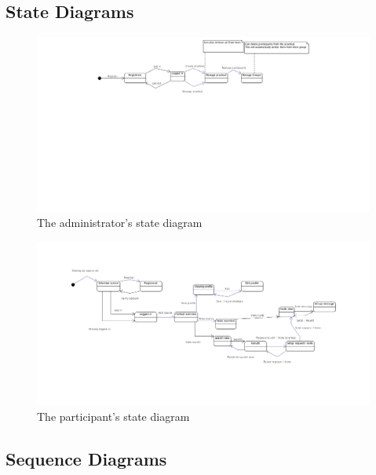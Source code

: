 \subsection{State Diagrams}

\begin{figure}[h]
    \centering
    \captionsetup{justification=centering}
    \includegraphics[width=\textwidth, frame]{images/state_diagram_admin}
    \caption{The administrator's state diagram}
    \label{state_diagram_admin}
\end{figure}

\begin{figure}[h]
    \centering
    \captionsetup{justification=centering}
    \includegraphics[width=\textwidth, frame]{images/state_diagram_participant}
    \caption{The participant's state diagram}
    \label{state_diagram_participant}
\end{figure}

\subsection{Sequence Diagrams}

